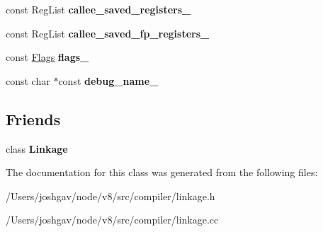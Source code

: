 \begin{DoxyCompactItemize}
\item 
const Reg\+List {\bfseries callee\+\_\+saved\+\_\+registers\+\_\+}\hypertarget{classv8_1_1internal_1_1compiler_1_1_call_descriptor_ac5d1182dda04fe7d81896e210b06af38}{}\label{classv8_1_1internal_1_1compiler_1_1_call_descriptor_ac5d1182dda04fe7d81896e210b06af38}

\item 
const Reg\+List {\bfseries callee\+\_\+saved\+\_\+fp\+\_\+registers\+\_\+}\hypertarget{classv8_1_1internal_1_1compiler_1_1_call_descriptor_a1ff6754470df26f45f82994c20033f6d}{}\label{classv8_1_1internal_1_1compiler_1_1_call_descriptor_a1ff6754470df26f45f82994c20033f6d}

\item 
const \hyperlink{classv8_1_1base_1_1_flags}{Flags} {\bfseries flags\+\_\+}\hypertarget{classv8_1_1internal_1_1compiler_1_1_call_descriptor_ac26e0b24b6e3bef9798a1911d960448d}{}\label{classv8_1_1internal_1_1compiler_1_1_call_descriptor_ac26e0b24b6e3bef9798a1911d960448d}

\item 
const char $\ast$const {\bfseries debug\+\_\+name\+\_\+}\hypertarget{classv8_1_1internal_1_1compiler_1_1_call_descriptor_a9db0f9dff4854e03f95206e0f9125e15}{}\label{classv8_1_1internal_1_1compiler_1_1_call_descriptor_a9db0f9dff4854e03f95206e0f9125e15}

\end{DoxyCompactItemize}
\subsection*{Friends}
\begin{DoxyCompactItemize}
\item 
class {\bfseries Linkage}\hypertarget{classv8_1_1internal_1_1compiler_1_1_call_descriptor_a630e1c2c772000cc88aada0fb04d7f76}{}\label{classv8_1_1internal_1_1compiler_1_1_call_descriptor_a630e1c2c772000cc88aada0fb04d7f76}

\end{DoxyCompactItemize}


The documentation for this class was generated from the following files\+:\begin{DoxyCompactItemize}
\item 
/\+Users/joshgav/node/v8/src/compiler/linkage.\+h\item 
/\+Users/joshgav/node/v8/src/compiler/linkage.\+cc\end{DoxyCompactItemize}
